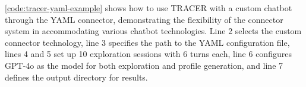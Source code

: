 \autoref{code:tracer-yaml-example} shows how to use \ac{TRACER}
with a custom chatbot through the YAML connector,
demonstrating the flexibility of the connector system
in accommodating various chatbot technologies.
Line 2 selects the custom connector technology,
line 3 specifies the path to the YAML configuration file,
lines 4 and 5 set up 10 exploration sessions with 6 turns each,
line 6 configures GPT-4o as the model for both exploration and profile generation,
and line 7 defines the output directory for results.
